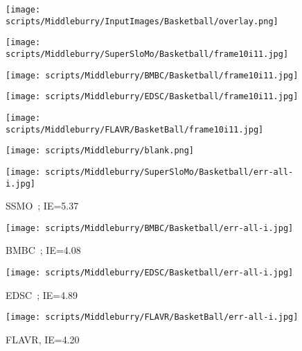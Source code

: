 \documentclass[10pt,twocolumn,letterpaper]{article}
\begin{document}
\begin{figure*}[t]
    \begin{center}
    
    \begin{subfigure}[b]{0.18\textwidth}
        \centering
        \texttt{[image: scripts/Middleburry/InputImages/Basketball/overlay.png]}
    \end{subfigure}
    \hfill
    \begin{subfigure}[b]{0.18\textwidth}
        \centering
        \texttt{[image: scripts/Middleburry/SuperSloMo/Basketball/frame10i11.jpg]}
    \end{subfigure}
    \hfill
    \begin{subfigure}[b]{0.18\textwidth}
        \centering
        \texttt{[image: scripts/Middleburry/BMBC/Basketball/frame10i11.jpg]}
    \end{subfigure}
    \hfill
    \begin{subfigure}[b]{0.18\textwidth}
        \centering
        \texttt{[image: scripts/Middleburry/EDSC/Basketball/frame10i11.jpg]}
    \end{subfigure}
    \hfill
    \begin{subfigure}[b]{0.18\textwidth}
        \centering
        \texttt{[image: scripts/Middleburry/FLAVR/BasketBall/frame10i11.jpg]}
    \end{subfigure}


     \begin{subfigure}[b]{0.18\textwidth}
        \centering
        \texttt{[image: scripts/Middleburry/blank.png]}
    \end{subfigure}
    \hfill
    \begin{subfigure}[b]{0.18\textwidth}
        \centering
        \texttt{[image: scripts/Middleburry/SuperSloMo/Basketball/err-all-i.jpg]}
        \caption*{SSMO~\cite{jiang2018super}; IE=5.37}
    \end{subfigure}
    \hfill
    \begin{subfigure}[b]{0.18\textwidth}
        \centering
        \texttt{[image: scripts/Middleburry/BMBC/Basketball/err-all-i.jpg]}
        \caption*{BMBC~\cite{park2020bmbc}; IE=4.08}
    \end{subfigure}
    \hfill
    \begin{subfigure}[b]{0.18\textwidth}
        \centering
        \texttt{[image: scripts/Middleburry/EDSC/Basketball/err-all-i.jpg]}
        \caption*{EDSC~\cite{cheng2020multiple}; IE=4.89}
    \end{subfigure}
    \hfill
    \begin{subfigure}[b]{0.18\textwidth}
        \centering
\texttt{[image: scripts/Middleburry/FLAVR/BasketBall/err-all-i.jpg]}
        \caption*{FLAVR, IE=4.20}
    \end{subfigure}
    



\end{center}
\end{figure*}
\end{document}
